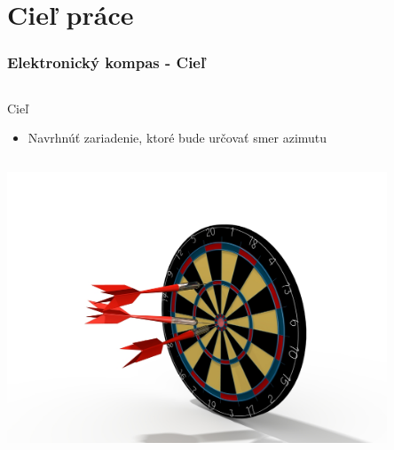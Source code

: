 \section{Cieľ práce}
\begin{snimka}
 \frametitle{Elektronický kompas - Cieľ}
   \begin{columns}[c]
    \begin{column}{0.4\textwidth}
    \begin{block}{Cieľ}
    \begin{itemize}
         \item Navrhnúť zariadenie, ktoré bude určovať smer azimutu
     \end{itemize}
  \end{block}
   \end{column}
  \end{columns}
      \begin{center}
       \includegraphics[width=0.85\textwidth]{obr/target1.jpg}
     \end{center}
\end{snimka}